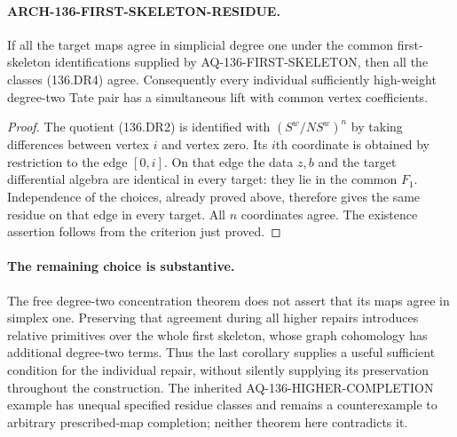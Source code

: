 \paragraph{ARCH-136-FIRST-SKELETON-RESIDUE.}
If all the target maps agree in simplicial degree one under the
common first-skeleton identifications supplied by
AQ-136-FIRST-SKELETON, then all the classes (136.DR4) agree.
Consequently every individual sufficiently high-weight degree-two
Tate pair has a simultaneous lift with common vertex coefficients.

\begin{proof}
The quotient (136.DR2) is identified with $(S^w/NS^w)^n$ by
taking differences between vertex $i$ and vertex zero. Its
$i$th coordinate is obtained by restriction to the edge $[0,i]$.
On that edge the data $z,b$ and the target differential algebra
are identical in every target: they lie in the common $F_1$.
Independence of the choices, already proved above, therefore
gives the same residue on that edge in every target. All $n$
coordinates agree. The existence assertion follows from the
criterion just proved.
\end{proof}

\paragraph{The remaining choice is substantive.}
The free degree-two concentration theorem does not assert that
its maps agree in simplex one. Preserving that agreement during
all higher repairs introduces relative primitives over the whole
first skeleton, whose graph cohomology has additional degree-two
terms. Thus the last corollary supplies a useful sufficient
condition for the individual repair, without silently supplying
its preservation throughout the construction. The inherited
AQ-136-HIGHER-COMPLETION example has unequal specified residue
classes and remains a counterexample to arbitrary prescribed-map
completion; neither theorem here contradicts it.
